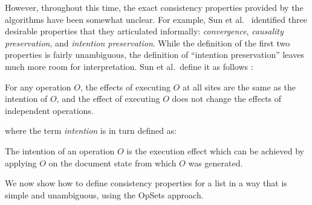 However, throughout this time, the exact consistency properties provided by the algorithms have been somewhat unclear.
For example, Sun et al.~\cite{Sun:1998un} identified three desirable properties that they articulated informally: \emph{convergence}, \emph{causality preservation}, and \emph{intention preservation}.
While the definition of the first two properties is fairly unambiguous, the definition of ``intention preservation'' leaves much more room for interpretation.
Sun et al.\ define it as follows \cite{Sun:1998un}:
\begin{displayquote}
For any operation $O$, the effects of executing $O$ at all sites are the same as the intention of $O$, and the effect of executing $O$ does not change the effects of independent operations.
\end{displayquote}
where the term \emph{intention} is in turn defined as:
\begin{displayquote}
The intention of an operation $O$ is the execution effect which can be achieved by applying $O$ on the document state from which $O$ was generated.
\end{displayquote}
We now show how to define consistency properties for a list in a way that is simple and unambiguous, using the OpSets approach.

